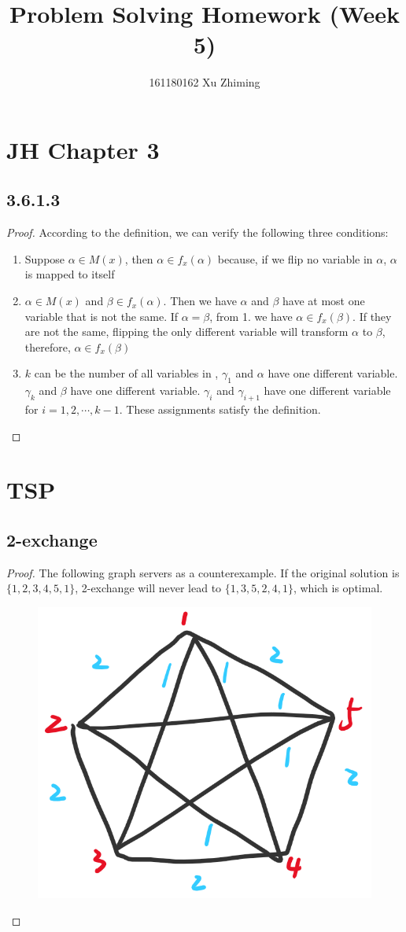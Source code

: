 \documentclass[twocolumn, 10.5pt]{article}
\begin{document}
	\title{Problem Solving Homework (Week 5)}\author{161180162 Xu Zhiming}\maketitle
	\section*{JH Chapter 3}
	\subsection*{3.6.1.3}
	\begin{proof}
		According to the definition, we can verify the following three conditions:
		\begin{enumerate}
			\item Suppose $\alpha\in M(x)$, then $\alpha\in f_x(\alpha)$ because, if we flip no variable in $\alpha$, $\alpha$ is mapped to itself
			\item $\alpha\in M(x)$ and $\beta\in f_x(\alpha)$. Then we have $\alpha$ and $\beta$ have at most one variable that is not the same. If $\alpha=\beta$, from 1. we have $\alpha\in f_x(\beta)$. If they are not the same, flipping the only different variable will transform $\alpha$ to $\beta$, therefore, $\alpha\in f_x(\beta)$ 
			\item $k$ can be the number of all variables in , $\gamma_1$ and $\alpha$ have one different variable. $\gamma_k$ and $\beta$ have one different variable. $\gamma_i$ and $\gamma_{i+1}$ have one different variable for $i=1,2,\cdots,k-1$. These assignments satisfy the definition.
			\end{enumerate}
	\end{proof}
	\section*{TSP}
	\subsection*{2-exchange}
	\begin{proof}
		The following graph servers as a counterexample. If the original solution is $\{1,2,3,4,5,1\}$, 2-exchange will never lead to $\{1,3,5,2,4,1\}$, which is optimal.
		\begin{figure}[H]
			\centering
			\includegraphics[width=0.7\linewidth]{ex5-1}
		\end{figure}
	\end{proof}
\end{document}
